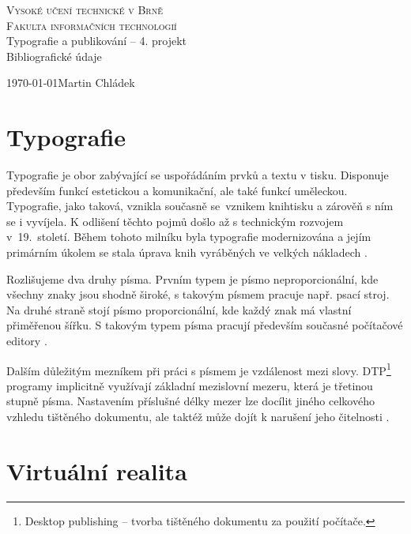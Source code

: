 \documentclass[a4paper,11pt]{article}
\begin{document}
\begin{titlepage}
\begin{center}
    
\textsc{\Huge Vysoké učení technické v Brně\\[0.4em]
\huge Fakulta informačních technologií} \\
{\LARGE{Typografie a publikování -- 4. projekt}\\[0.3em] \Huge{Bibliografické údaje}}\\ 
\end{center}
{\Large \today \hfill Martin Chládek}

\end{titlepage}

\newpage

\section{Typografie}

Typografie je obor zabývající se uspořádáním prvků a textu v tisku. Disponuje především funkcí estetickou a komunikační, ale také funkcí uměleckou. Typografie, jako taková, vznikla současně se~vznikem knihtisku a zárověň s ním se i vyvíjela. K odlišení těchto pojmů došlo až s technickým rozvojem v~19.~století. Během tohoto milníku byla typografie modernizována a jejím primárním úkolem se stala úprava knih vyráběných ve velkých nákladech \cite{Marketa_Hoskova:Vojtech_Pressing_a_typografie_jeho_doby}.

Rozlišujeme dva druhy písma. Prvním typem je písmo neproporcionální, kde všechny znaky jsou shodně široké, s takovým písmem pracuje např. psací stroj. Na druhé straně stojí písmo proporcionální, kde každý znak má vlastní přiměřenou šířku. S takovým typem písma pracují především současné počítačové editory \cite{Lenka_Cerna:Typografie}. 

Dalším důležitým mezníkem při práci s písmem je vzdálenost mezi slovy. DTP\footnote{Desktop publishing -- tvorba tištěného dokumentu za použití počítače.} programy implicitně využívají základní mezislovní mezeru, která je třetinou stupně písma. Nastavením příslušné délky mezer lze docílit jiného celkového vzhledu tištěného dokumentu, ale taktéž může dojít k narušení jeho čitelnosti \cite{Vladimir_Beran:Typograficky_manual}.  

\section{Virtuální realita}
\end{document}
